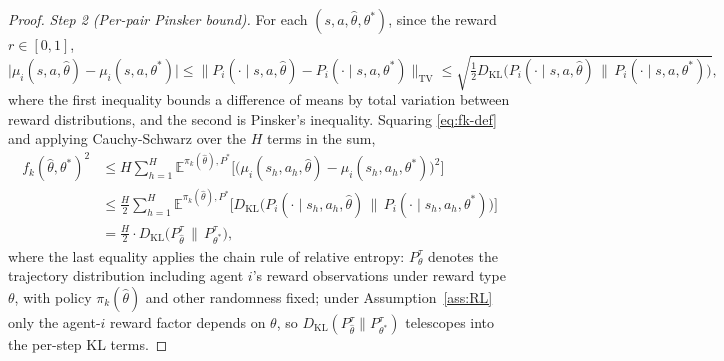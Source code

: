 \documentclass{article}
\begin{document}
\begin{proof}
\textit{Step 2 (Per-pair Pinsker bound).} For each $(s, a, \hat{\theta}, \theta^*)$, since the reward $r \in [0, 1]$,
\begin{equation}
\big|\mu_i(s, a, \hat{\theta}) - \mu_i(s, a, \theta^*)\big| \leq \|P_i(\cdot \mid s, a, \hat{\theta}) - P_i(\cdot \mid s, a, \theta^*)\|_{\mathrm{TV}} \leq \sqrt{\tfrac{1}{2} D_{\mathrm{KL}}\big(P_i(\cdot \mid s, a, \hat{\theta}) \,\big\|\, P_i(\cdot \mid s, a, \theta^*)\big)},
\end{equation}
where the first inequality bounds a difference of means by total variation between reward distributions, and the second is Pinsker's inequality. Squaring \eqref{eq:fk-def} and applying Cauchy-Schwarz over the $H$ terms in the sum,
\begin{align}
f_k(\hat{\theta}, \theta^*)^2 &\leq H \sum_{h=1}^H \mathbb{E}^{\pi_k(\hat{\theta}), P^*}\big[\big(\mu_i(s_h, a_h, \hat{\theta}) - \mu_i(s_h, a_h, \theta^*)\big)^2\big] \\
&\leq \tfrac{H}{2} \sum_{h=1}^H \mathbb{E}^{\pi_k(\hat{\theta}), P^*}\big[D_{\mathrm{KL}}\big(P_i(\cdot \mid s_h, a_h, \hat{\theta}) \,\big\|\, P_i(\cdot \mid s_h, a_h, \theta^*)\big)\big] \\
\label{eq:fk-KL-traj}
&= \tfrac{H}{2} \cdot D_{\mathrm{KL}}\big(P_{\hat{\theta}}^{\tau} \,\big\|\, P_{\theta^*}^{\tau}\big),
\end{align}
where the last equality applies the chain rule of relative entropy: $P_\theta^\tau$ denotes the trajectory distribution including agent $i$'s reward observations under reward type $\theta$, with policy $\pi_k(\hat{\theta})$ and other randomness fixed; under Assumption~\ref{ass:RL} only the agent-$i$ reward factor depends on $\theta$, so $D_{\mathrm{KL}}(P_{\hat{\theta}}^\tau \| P_{\theta^*}^\tau)$ telescopes into the per-step KL terms.


\end{proof}
\end{document}
